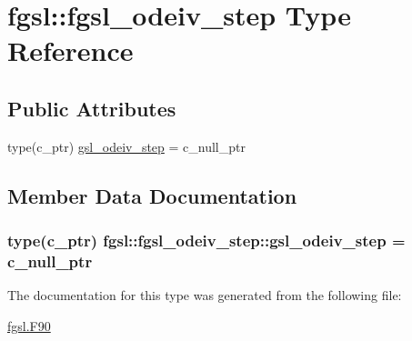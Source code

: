 \hypertarget{structfgsl_1_1fgsl__odeiv__step}{\section{fgsl\-:\-:fgsl\-\_\-odeiv\-\_\-step Type Reference}
\label{structfgsl_1_1fgsl__odeiv__step}
}
\subsection*{Public Attributes}
\begin{DoxyCompactItemize}
\item 
type(c\-\_\-ptr) \hyperlink{structfgsl_1_1fgsl__odeiv__step_a1a7adfeea10c02a0a4fabca3a03bb3d2}{gsl\-\_\-odeiv\-\_\-step} = c\-\_\-null\-\_\-ptr
\end{DoxyCompactItemize}


\subsection{Member Data Documentation}
\hypertarget{structfgsl_1_1fgsl__odeiv__step_a1a7adfeea10c02a0a4fabca3a03bb3d2}{
\subsubsection[{gsl\-\_\-odeiv\-\_\-step}]{\setlength{\rightskip}{0pt plus 5cm}type(c\-\_\-ptr) fgsl\-::fgsl\-\_\-odeiv\-\_\-step\-::gsl\-\_\-odeiv\-\_\-step = c\-\_\-null\-\_\-ptr}}\label{structfgsl_1_1fgsl__odeiv__step_a1a7adfeea10c02a0a4fabca3a03bb3d2}


The documentation for this type was generated from the following file\-:\begin{DoxyCompactItemize}
\item 
\hyperlink{fgsl_8F90}{fgsl.\-F90}\end{DoxyCompactItemize}
